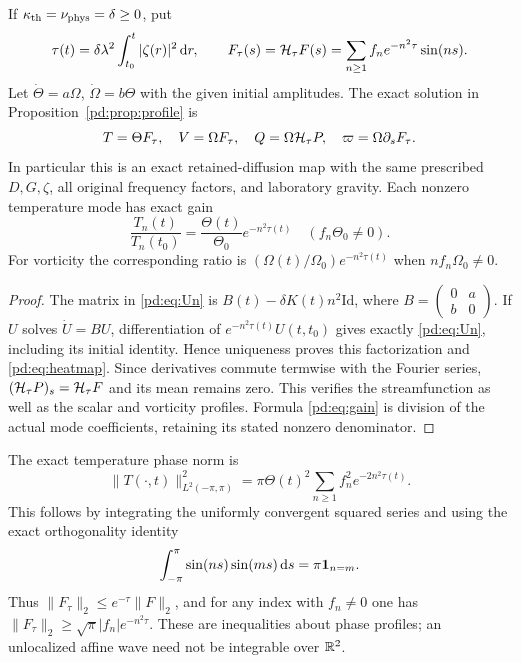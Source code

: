 \begin{pdproposition}\label{pd:prop:heat}
If $\kappa_{\rm th}=\nu_{\rm phys}=\delta\geq0$, put
\begin{equation}\label{pd:eq:heattime}
 \tau(t)=\delta\lambda^2\int_{t_0}^t|\zeta(r)|^2\,\mathrm d r,
 \qquad
 F_{\tau}(s)=\mathcal H_{\tau}F(s)=\sum_{n\geq1}f_ne^{-n^2\tau}\sin(ns).
\end{equation}
Let $\dot\Theta=a\Omega$, $\dot\Omega=b\Theta$ with the given initial
amplitudes. The exact solution in Proposition~\ref{pd:prop:profile} is
\begin{equation}\label{pd:eq:heatmap}
 T=\Theta F_\tau,\quad V=\Omega F_\tau,\quad
 Q=\Omega\mathcal H_\tau P,
 \quad \varpi=\Omega\partial_sF_\tau.
\end{equation}
In particular this is an exact retained-diffusion map with the same
prescribed $D,G,\zeta$, all original frequency factors, and laboratory
gravity. Each nonzero temperature mode has exact gain
\begin{equation}\label{pd:eq:gain}
 \frac{T_n(t)}{T_n(t_0)}
   =\frac{\Theta(t)}{\Theta_0}e^{-n^2\tau(t)}
 \quad(f_n\Theta_0\ne0).
\end{equation}
For vorticity the corresponding ratio is
$(\Omega(t)/\Omega_0)e^{-n^2\tau(t)}$ when $nf_n\Omega_0\ne0$.
\end{pdproposition}
\begin{proof}
The matrix in \eqref{pd:eq:Un} is $B(t)-\delta K(t)n^2\mathrm{Id}$,
where $B=\left(\begin{smallmatrix}0&a\\b&0\end{smallmatrix}\right)$.
If $U$ solves $\dot U=BU$, differentiation of
$e^{-n^2\tau(t)}U(t,t_0)$ gives exactly \eqref{pd:eq:Un}, including its
initial identity. Hence uniqueness proves this factorization and
\eqref{pd:eq:heatmap}. Since derivatives commute termwise with the Fourier
series, $(\mathcal H_\tau P)_s=\mathcal H_\tau F$ and its mean remains zero.
This verifies the streamfunction as well as the scalar and vorticity
profiles. Formula \eqref{pd:eq:gain} is division of the actual mode
coefficients, retaining its stated nonzero denominator.
\end{proof}

The exact temperature phase norm is
\begin{equation}\label{pd:eq:norm}
 \|T(\cdot,t)\|_{L^2(-\pi,\pi)}^2
 =\pi\Theta(t)^2\sum_{n\geq1}f_n^2e^{-2n^2\tau(t)}.
\end{equation}
This follows by integrating the uniformly convergent squared series and
using the exact orthogonality identity
\[
 \int_{-\pi}^{\pi}\sin(ns)\sin(ms)\,\mathrm d s=\pi\mathbf1_{n=m}.
\]
Thus $\|F_\tau\|_2\leq e^{-\tau}\|F\|_2$, and for any index with
$f_n\ne0$ one has $\|F_\tau\|_2\geq\sqrt\pi|f_n|e^{-n^2\tau}$.
These are inequalities about phase profiles; an unlocalized affine wave
need not be integrable over $\mathbb R^2$.

